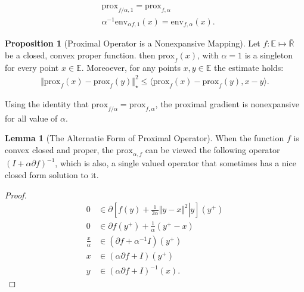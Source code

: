 \documentclass[]{article}
\theoremstyle{definition}
\newtheorem{prop}{Proposition}[section]  %
\newtheorem{lemma}{Lemma}[subsection]  %
\begin{document}
        $$
        \begin{aligned}
            & \text{prox}_{f/\alpha, 1} =  \text{prox}_{f, \alpha}
            \\
            & \alpha^{-1}\text{env}_{\alpha f, 1}(x) = \text{env}_{f, \alpha}(x). 
        \end{aligned}
        $$
        \begin{prop}[Proximal Operator is a Nonexpansive Mapping]
            Let $f:\mathbb E \mapsto \mathbb{\bar R}$ be a closed, convex proper function. then $\text{prox}_f(x)$, with $\alpha= 1$ is a singleton for every point $x\in \mathbb E$. Moreoever, for any points $x, y\in \mathbb E$ the estimate holds: 
            $$
                \begin{aligned}
                    \Vert \text{prox}_f(x) - \text{prox}_f(y)\Vert^2_\star \le 
                    \langle \text{prox}_f(x) - \text{prox}_f(y), x - y\rangle. 
                \end{aligned}
            $$
        \end{prop}
        Using the identity that $\text{prox}_{f/\alpha} = \text{prox}_{f, \alpha}$, the proximal gradient is nonexpansive for all value of $\alpha$. 
        \begin{lemma}[The Alternatie Form of Proximal Operator]\label{lemma:prox_alternative_form}
            When the function $f$ is convex closed and proper, the $\text{prox}_{\alpha, f}$ can be viewed the following operator $(I + \alpha \partial f)^{-1}$, which is also, a single valued operator that sometimes has a nice closed form solution to it.
        \end{lemma}
        \begin{proof}
            \begin{align*}
                0 &\in \partial\left[
                    \left.
                        f(y) + \frac{1}{2\alpha} \Vert y - x\Vert^2 
                    \right| y
                \right](y^+)
                \\
                0 &\in \partial f(y^+) + \frac{1}{\alpha}(y^+ - x)
                \\
                \frac{x}{\alpha} &\in 
                (\partial f + \alpha^{-1}I)(y^+)
                \\
                x &\in 
                (\alpha \partial f + I)(y^+)
                \\
                y &\in (\alpha\partial f+ I)^{-1}(x).
            \end{align*}
        \end{proof}
\end{document}
